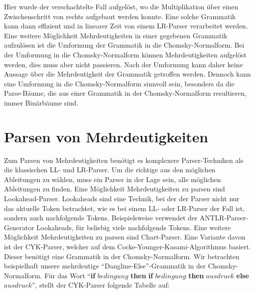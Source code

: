 \documentclass[runningheads]{llncs}
\begin{document}
    Hier wurde der verschachtelte Fall aufgelöst,
    wo die Multiplikation über einen Zwischenschritt von rechts aufgebaut werden konnte.
    Eine solche Grammatik kann dann effizient und in linearer Zeit von einem LR-Parser verarbeitet werden.
    Eine weitere Möglichkeit Mehrdeutigkeiten in einer gegebenen Grammatik aufzulösen
    ist die Umformung der Grammatik in die Chomsky-Normalform.
    Bei der Umformung in die Chomsky-Normalform können Mehrdeutigkeiten aufgelöst werden, dies muss aber nicht passieren.
    Nach der Umformung kann daher keine Aussage über die Mehrdeutigkeit der Grammatik getroffen werden.
    Dennoch kann eine Umformung in die Chomsky-Normalform sinnvoll sein, besonders da die Parse-Bäume,
    die aus einer Grammatik in der Chomsky-Normalform resultieren, immer Binärbäume sind.



    \newpage


    \section{Parsen von Mehrdeutigkeiten}\label{sec:parsen-von-mehrdeutigkeiten}

    Zum Parsen von Mehrdeutigkeiten benötigt es komplexere Parser-Techniken als die klassischen LL- und LR-Parser.
    Um die richtige aus den möglichen Ableitungen zu wählen,
    muss ein Parser in der Lage sein, alle möglichen Ableitungen zu finden.
    Eine Möglichkeit Mehrdeutigkeiten zu parsen sind Lookahead-Parser.
    Lookaheads sind eine Technik, bei der der Parser nicht nur das aktuelle Token betrachtet,
    wie es bei einem LL- oder LR-Parser der Fall ist, sondern auch nachfolgende Tokens.
    Beispielsweise verwendet der ANTLR-Parser-Generator Lookaheads,
    für beliebig viele nachfolgende Tokens.
    Eine weitere Möglichkeit Mehrdeutigkeiten zu parsen sind Chart-Parser.
    Eine Variante davon ist der CYK-Parser, welcher auf dem Cocke-Younger-Kasami-Algorithmus basiert.
    Dieser benötigt eine Grammatik in der Chomsky-Normalform.
    Wir betrachten beispielhaft unsere mehrdeutige ``Dangline-Else''-Grammatik in der Chomsky-Normalform.
    Für das Wort ``\textbf{if} $bedingung$ \textbf{then} \textbf{if} $bedingung$ \textbf{then} $ausdruck$ \textbf{else} $ausdruck$'',
    stellt der CYK-Parser folgende Tabelle auf:
\end{document}
